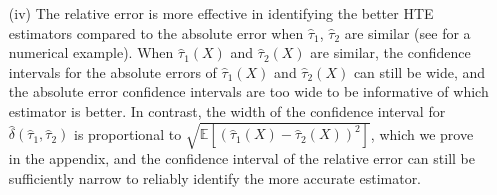 \documentclass[twoside]{article}
\newcommand{\1}{{\mathbbm{1}}}
\def\EE{\mathbb{E}}
\begin{document}
\begin{itemize}
    \item [(iv)] The relative error is more effective in identifying the better HTE estimators compared to the absolute error when $\hat{\tau}_1$, $\hat{\tau}_2$ are similar (see  for a numerical example).
    When $\hat{\tau}_1(X)$ and $\hat{\tau}_2(X)$ are similar, the confidence intervals for the absolute errors of $\hat{\tau}_1(X)$ and $\hat{\tau}_2(X)$ can still be wide, and the absolute error confidence intervals are too wide to be informative of which estimator is better.
    In contrast, the width of the confidence interval for $\hat{\delta}(\hat{\tau}_1, \hat{\tau}_2)$ is proportional to $\sqrt{\EE[(\hat{\tau}_1(X) - \hat{\tau}_2(X))^2]}$, which we prove in the appendix, and the confidence interval of the relative error can still be sufficiently narrow to reliably identify the more accurate estimator.   
\end{itemize}
\end{document}
